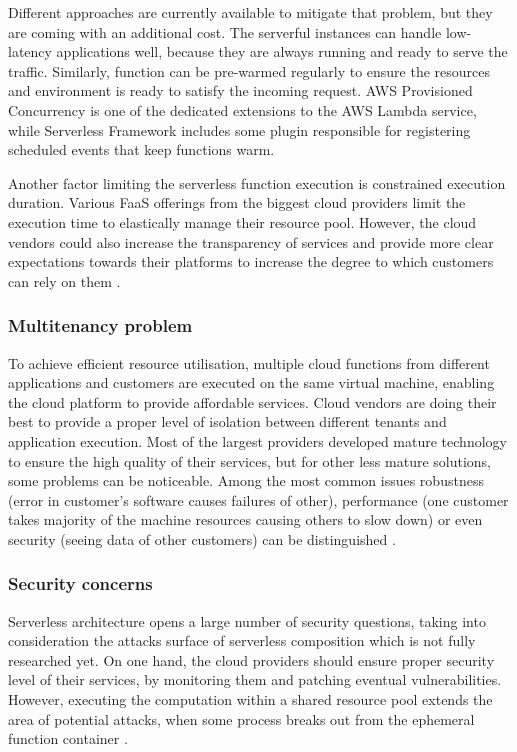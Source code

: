 Different approaches are currently available to mitigate that problem, but they are coming with an additional cost. The serverful instances can handle low-latency applications well, because they are always running and ready to serve the traffic. Similarly, function can be pre-warmed regularly to ensure the resources and environment is ready to satisfy the incoming request. AWS Provisioned Concurrency is one of the dedicated extensions to the AWS Lambda service, while Serverless Framework includes some plugin responsible for registering scheduled events that keep functions warm.

Another factor limiting the serverless function execution is constrained execution duration. Various FaaS offerings from the biggest cloud providers limit the execution time to elastically manage their resource pool. However, the cloud vendors could also increase the transparency of services and provide more clear expectations towards their platforms to increase the degree to which customers can rely on them \cite{MartinFowlerServerless}.

\subsubsection{Multitenancy problem} \label{chapter:serverless-multitenancy-problem}

To achieve efficient resource utilisation, multiple cloud functions from different applications and customers are executed on the same virtual machine, enabling the cloud platform to provide affordable services. Cloud vendors are doing their best to provide a proper level of isolation between different tenants and application execution. Most of the largest providers developed mature technology to ensure the high quality of their services, but for other less mature solutions, some problems can be noticeable. Among the most common issues robustness (error in customer’s software causes failures of other), performance (one customer takes majority of the machine resources causing others to slow down) or even security (seeing data of other customers) can be distinguished \cite{MartinFowlerServerless}.

\subsubsection{Security concerns} \label{chapter:serverless-security-concerns}

Serverless architecture opens a large number of security questions, taking into consideration the attacks surface of serverless composition which is not fully researched yet. On one hand, the cloud providers should ensure proper security level of their services, by monitoring them and patching eventual vulnerabilities. However, executing the computation within a shared resource pool extends the area of potential attacks, when some process breaks out from the ephemeral function container \cite{LeveragingServerlessCloudComputingArchitectures}.


